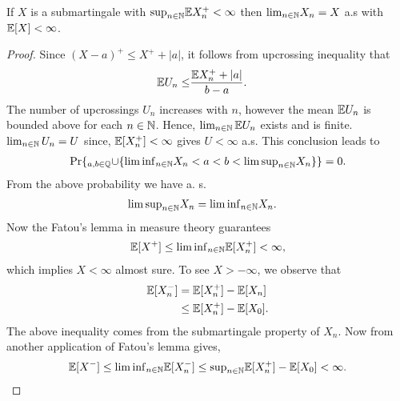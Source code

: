 \documentclass[a4paper,10pt,english]{article}
\begin{document}
\begin{thm} 
\label{MartingaleConvergenceTheorem} 
If $X$ is a submartingale with ${\sup}_{n\in \mathbb{N}} \mathbb{E} X_n^{+} < \infty$ then ${\lim}_{n\in \mathbb{N}} X_n=X$ a.s with $\mathbb{E}[X]<\infty$.
\end{thm}
\begin{proof} 
Since $(X-a)^{+}\leq X^{+}+|a|$, it follows from upcrossing inequality that   		
\begin{align*}
\mathbb{E} U_n \leq& \frac{\mathbb{E} X_n^{+} +|a|}{b-a}.
\end{align*}
The number of upcrossings $U_n$ increases with $n$, however the mean $\mathbb{E} U_n$ is bounded above for each $n \in \mathbb{N}$. 
Hence, $\lim_{n \in \mathbb{N}}\mathbb{E} U_n$ exists and is finite. 
    			$\lim_{n \in \mathbb{N}} U_n=U$ since, $\mathbb{E} [X_n^{+}] < \infty$ gives $U<\infty$ a.s. This conclusion leads to  
    			\begin{align*}
    			\Pr\{_{a,b \in \mathbb{Q}}{\cup}\{{\lim \inf}_{n\in \mathbb{N}}  X_n<a<b<{\lim \sup}_{n\in \mathbb{N}}  X_n \}\} = 0.
    			\end{align*}
    		  From the above probability we have a. s.
    		  \begin{align*}
    		  	{\lim \sup}_{n\in \mathbb{N}}  X_n &={\lim \inf}_{n\in \mathbb{N}}  X_n.
    		  	\end{align*}
    		  	Now the Fatou's lemma in measure theory guarantees
    		  	\begin {align*}
    		  	\mathbb{E}[X^{+}]\leq {\lim \inf}_{n\in \mathbb{N}}\mathbb{E}[X_n^{+}]<\infty,
    		  \end{align*}
    		  	which implies $X<\infty$  almost sure. To see $X>-\infty$, we observe that
    		  	\begin{align*}
    		  		\mathbb{E}[X_n^{-}]&=\mathbb{E}[X_n^{+}]-\mathbb{E}[X_n]\\
    		  		&\leq \mathbb{E}[X_n^{+}]-\mathbb{E}[X_0].
    		  		\end{align*} 
    		  		The above inequality comes from the submartingale property of $X_n$. Now from another application of Fatou's lemma gives,
    		  		\begin{align*}
    		  		\mathbb{E}[X^{-}]\leq {\lim \inf} _{n\in \mathbb{N}}\mathbb{E}[X_n^{-}] \leq {\sup}_{n\in \mathbb{N}}\mathbb{E}[X_n^{+}]-\mathbb{E}[X_0]<\infty.
    		  		\end{align*}
    		\end{proof}
\end{document}

